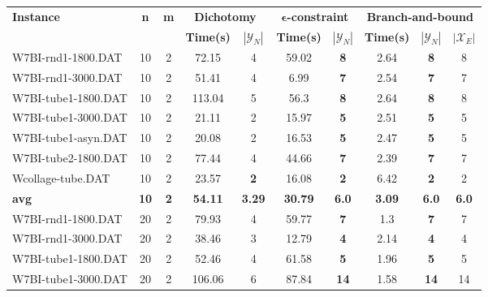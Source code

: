 \begin{table}[h]
\centering
\hspace*{-1cm}\begin{tabular}{lccccccccc}
\toprule
\textbf{Instance} & \textbf{n} & \textbf{m} & \multicolumn{2}{c}{\textbf{Dichotomy}} & \multicolumn{2}{c}{\textbf{$\mathbf{\epsilon}$-constraint}}  & \multicolumn{3}{c}{\textbf{Branch-and-bound}}
\\
\cmidrule(r){4-5} \cmidrule(r){6-7} \cmidrule(r){8-10}
~ & ~ & ~ & \textbf{Time(s)} & \textbf{$|\mathcal{Y}_N|$} & \textbf{Time(s)} & \textbf{$|\mathcal{Y}_N|$} & \textbf{Time(s)} & \textbf{$|\mathcal{Y}_N|$} & \textbf{$|\mathcal{X}_E|$} \\
\midrule

W7BI-rnd1-1800.DAT & 10 & 2 & 72.15 & 4 & 59.02 &  \textbf{8} &  \textcolor{blue2}{2.64} &  \textbf{8}  & 8 \\
W7BI-rnd1-3000.DAT & 10 & 2 & 51.41 & 4 & 6.99 &  \textbf{7} &  \textcolor{blue2}{2.54} &  \textbf{7}  & 7 \\
W7BI-tube1-1800.DAT & 10 & 2 & 113.04 & 5 & 56.3 &  \textbf{8} &  \textcolor{blue2}{2.64} &  \textbf{8}  & 8 \\
W7BI-tube1-3000.DAT & 10 & 2 & 21.11 & 2 & 15.97 &  \textbf{5} &  \textcolor{blue2}{2.51} &  \textbf{5}  & 5 \\
W7BI-tube1-asyn.DAT & 10 & 2 & 20.08 & 2 & 16.53 &  \textbf{5} &  \textcolor{blue2}{2.47} &  \textbf{5}  & 5 \\
W7BI-tube2-1800.DAT & 10 & 2 & 77.44 & 4 & 44.66 &  \textbf{7} &  \textcolor{blue2}{2.39} &  \textbf{7}  & 7 \\
Wcollage-tube.DAT & 10 & 2 & 23.57 &  \textbf{2} & 16.08 &  \textbf{2} &  \textcolor{blue2}{6.42} &  \textbf{2}  & 2 \\
\cline{1-10} \textbf{avg} & \textbf{10} & \textbf{2} & \textbf{54.11} & \textbf{3.29} & \textbf{30.79} & \textbf{6.0} & \textbf{3.09} & \textbf{6.0} & \textbf{6.0} \\ \cline{1-10}
W7BI-rnd1-1800.DAT & 20 & 2 & 79.93 & 4 & 59.77 &  \textbf{7} &  \textcolor{blue2}{1.3} &  \textbf{7}  & 7 \\
W7BI-rnd1-3000.DAT & 20 & 2 & 38.46 & 3 & 12.79 &  \textbf{4} &  \textcolor{blue2}{2.14} &  \textbf{4}  & 4 \\
W7BI-tube1-1800.DAT & 20 & 2 & 52.46 & 4 & 61.58 &  \textbf{5} &  \textcolor{blue2}{1.96} &  \textbf{5}  & 5 \\
W7BI-tube1-3000.DAT & 20 & 2 & 106.06 & 6 & 87.84 &  \textbf{14} &  \textcolor{blue2}{1.58} &  \textbf{14}  & 14 \\

\end{tabular}
\end{table}
